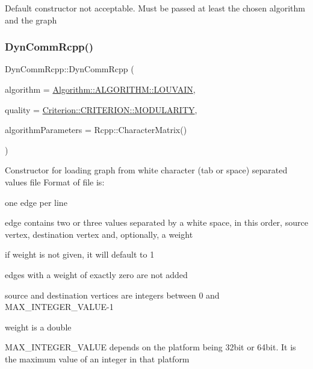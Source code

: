 Default constructor not acceptable. Must be passed at least the chosen algorithm and the graph \mbox{\label{classDynCommRcpp_a1e3ae3a0be89f2a661dc09d7842a3ac7}} 
\subsubsection{\texorpdfstring{Dyn\+Comm\+Rcpp()}{DynCommRcpp()}\hspace{0.1cm}{\footnotesize\ttfamily [2/2]}}
{\footnotesize\ttfamily Dyn\+Comm\+Rcpp\+::\+Dyn\+Comm\+Rcpp (\begin{DoxyParamCaption}\item[{\hyperlink{classAlgorithm_a38e19a8c3dc51b97563a34d9e59a748d}{Algorithm\+::\+A\+L\+G\+O\+R\+I\+T\+HM}}]{algorithm = {\ttfamily \hyperlink{classAlgorithm_a38e19a8c3dc51b97563a34d9e59a748dab77e66715d6be972cdbf6cc4d990e732}{Algorithm\+::\+A\+L\+G\+O\+R\+I\+T\+H\+M\+::\+L\+O\+U\+V\+A\+IN}},  }\item[{const \hyperlink{classCriterion_a55594c223ce0837b8319c46c66cb648f}{Criterion\+::\+C\+R\+I\+T\+E\+R\+I\+ON} \&}]{quality = {\ttfamily \hyperlink{classCriterion_a55594c223ce0837b8319c46c66cb648fa2a7d416fbe43baf234420601ea73d946}{Criterion\+::\+C\+R\+I\+T\+E\+R\+I\+O\+N\+::\+M\+O\+D\+U\+L\+A\+R\+I\+TY}},  }\item[{Rcpp\+::\+Character\+Matrix}]{algorithm\+Parameters = {\ttfamily Rcpp\+:\+:CharacterMatrix()} }\end{DoxyParamCaption})\hspace{0.3cm}{\ttfamily [inline]}}

Constructor for loading graph from white character (tab or space) separated values file Format of file is\+:
\begin{DoxyItemize}
\item one edge per line
\item edge contains two or three values separated by a white space, in this order, source vertex, destination vertex and, optionally, a weight
\item if weight is not given, it will default to 1
\item edges with a weight of exactly zero are not added
\item source and destination vertices are integers between 0 and M\+A\+X\+\_\+\+I\+N\+T\+E\+G\+E\+R\+\_\+\+V\+A\+L\+U\+E-\/1
\item weight is a double
\item M\+A\+X\+\_\+\+I\+N\+T\+E\+G\+E\+R\+\_\+\+V\+A\+L\+UE depends on the platform being 32bit or 64bit. It is the maximum value of an integer in that platform 
\end{DoxyItemize}

